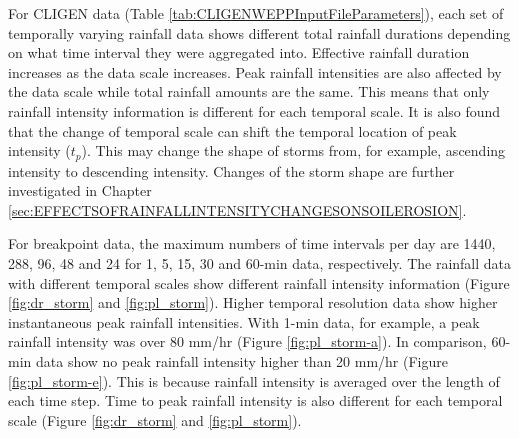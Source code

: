 For CLIGEN data (Table \ref{tab:CLIGENWEPPInputFileParameters}), each set of
temporally varying rainfall data shows different total rainfall durations
depending on what time interval they were aggregated into. Effective rainfall
duration increases as the data scale increases. Peak rainfall intensities are
also affected by the data scale while total rainfall amounts are the same. This
means that only rainfall intensity information is different for each temporal
scale. It is also found that the change of temporal scale can shift the temporal
location of peak intensity ($t_p$). This may change the shape of storms from,
for example, ascending intensity to descending intensity. Changes of the storm
shape are further investigated in Chapter
\ref{sec:EFFECTSOFRAINFALLINTENSITYCHANGESONSOILEROSION}.

For breakpoint data, the maximum numbers of time intervals per day are 1440,
288, 96, 48 and 24 for 1, 5, 15, 30 and 60-min data, respectively. The rainfall
data with different temporal scales show different rainfall intensity
information (Figure \ref{fig:dr_storm} and \ref{fig:pl_storm}). Higher temporal
resolution data show higher instantaneous peak rainfall intensities. With 1-min
data, for example, a peak rainfall intensity was over 80 mm/hr (Figure
\ref{fig:pl_storm-a}). In comparison, 60-min data show no peak rainfall
intensity higher than 20 mm/hr (Figure \ref{fig:pl_storm-e}). This is because
rainfall intensity is averaged over the length of each time step. Time to peak
rainfall intensity is also different for each temporal scale (Figure
\ref{fig:dr_storm} and \ref{fig:pl_storm}).

